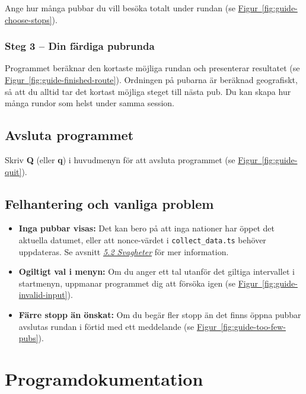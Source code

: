 \documentclass[a4paper, 12pt]{article}
\begin{document}
        Ange hur många pubbar du vill besöka totalt under rundan (se \hyperref[fig:guide-choose-stops]{Figur~\ref*{fig:guide-choose-stops}}).

        \subsubsection*{Steg 3 -- Din färdiga pubrunda}

        Programmet beräknar den kortaste möjliga rundan och presenterar resultatet (se \hyperref[fig:guide-finished-route]{Figur~\ref*{fig:guide-finished-route}}). Ordningen på pubarna är beräknad geografiskt, så att du alltid tar det kortast möjliga steget till nästa pub. Du kan skapa hur många rundor som helst under samma session.

    \subsection{Avsluta programmet}

        Skriv \textbf{Q} (eller \textbf{q}) i huvudmenyn för att avsluta programmet (se \hyperref[fig:guide-quit]{Figur~\ref*{fig:guide-quit}}).

    \subsection{Felhantering och vanliga problem}
    \label{subsec: felhantering}
        \begin{itemize}
            \item \textbf{Inga pubbar visas:} Det kan bero på att inga nationer har öppet det aktuella datumet, eller att nonce-värdet i \texttt{collect\_data.ts} behöver uppdateras. Se avsnitt \hyperref[subsec: svagheter]{\textit{5.2 Svagheter}} för mer information.
            \item \textbf{Ogiltigt val i menyn:} Om du anger ett tal utanför det giltiga intervallet i startmenyn, uppmanar programmet dig att försöka igen (se \hyperref[fig:guide-invalid-input]{Figur~\ref*{fig:guide-invalid-input}}).
            \item \textbf{Färre stopp än önskat:} Om du begär fler stopp än det finns öppna pubbar avslutas rundan i förtid med ett meddelande (se \hyperref[fig:guide-too-few-pubs]{Figur~\ref*{fig:guide-too-few-pubs}}).
        \end{itemize}

\section{Programdokumentation}
\label{sec: dokumentation}
\end{document}
